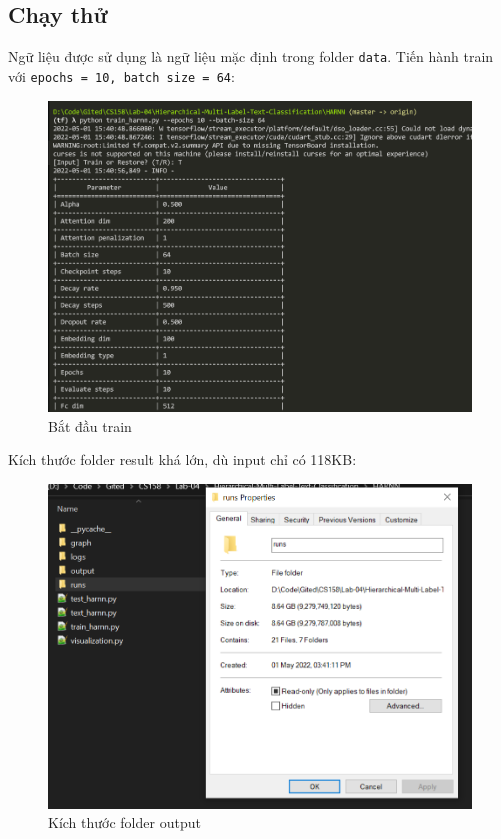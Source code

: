 \documentclass[12pt]{article}
\begin{document}
\subsection{Chạy thử}
Ngữ liệu được sử dụng là ngữ liệu mặc định trong folder \texttt{data}. Tiến hành train với \texttt{epochs = 10, batch size = 64}:
\begin{figure}[H]
    \centering
    \includegraphics[scale=.5]{img/start-training.PNG}
    \caption{Bắt đầu train}
    \label{fig:start_training}
\end{figure}

Kích thước folder result khá lớn, dù input chỉ có 118KB:
\begin{figure}[H]
    \centering
    \includegraphics[scale=.7]{img/output-size.PNG}
    \caption{Kích thước folder output}
    \label{fig:output_size}
\end{figure}
\end{document}
